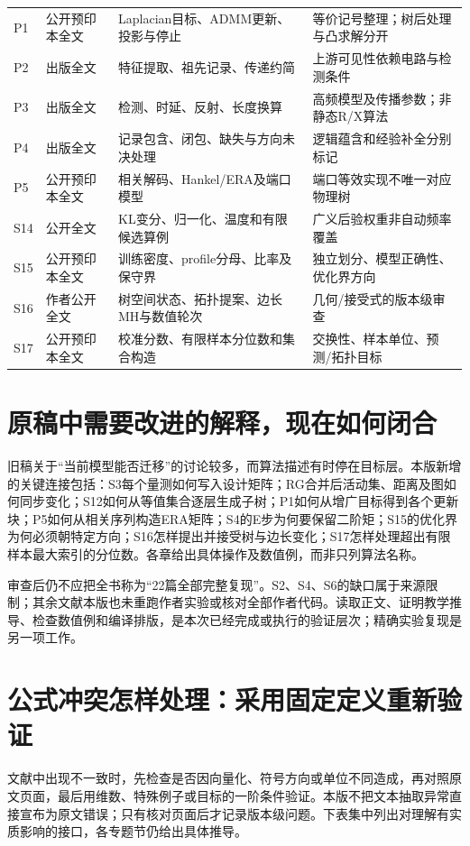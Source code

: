 \begin{longtable}{p{}p{}p{}p{}}
P1 & 公开预印本全文 & Laplacian目标、ADMM更新、投影与停止 & 等价记号整理；树后处理与凸求解分开\\
P2 & 出版全文 & 特征提取、祖先记录、传递约简 & 上游可见性依赖电路与检测条件\\
P3 & 出版全文 & 检测、时延、反射、长度换算 & 高频模型及传播参数；非静态R/X算法\\
P4 & 出版全文 & 记录包含、闭包、缺失与方向未决处理 & 逻辑蕴含和经验补全分别标记\\
P5 & 公开预印本全文 & 相关解码、Hankel/ERA及端口模型 & 端口等效实现不唯一对应物理树\\
S14 & 公开全文 & KL变分、归一化、温度和有限候选算例 & 广义后验权重非自动频率覆盖\\
S15 & 公开预印本全文 & 训练密度、profile分母、比率及保守界 & 独立划分、模型正确性、优化界方向\\
S16 & 作者公开全文 & 树空间状态、拓扑提案、边长MH与数值轮次 & 几何/接受式的版本级审查\\
S17 & 公开预印本全文 & 校准分数、有限样本分位数和集合构造 & 交换性、样本单位、预测/拓扑目标\\
\bottomrule
\end{longtable}

\section{原稿中需要改进的解释，现在如何闭合}
旧稿关于“当前模型能否迁移”的讨论较多，而算法描述有时停在目标层。本版新增的关键连接包括：S3每个量测如何写入设计矩阵；RG合并后活动集、距离及图如何同步变化；S12如何从等值集合逐层生成子树；P1如何从增广目标得到各个更新块；P5如何从相关序列构造ERA矩阵；S4的E步为何要保留二阶矩；S15的优化界为何必须朝特定方向；S16怎样提出并接受树与边长变化；S17怎样处理超出有限样本最大索引的分位数。各章给出具体操作及数值例，而非只列算法名称。

审查后仍不应把全书称为“22篇全部完整复现”。S2、S4、S6的缺口属于来源限制；其余文献本版也未重跑作者实验或核对全部作者代码。读取正文、证明教学推导、检查数值例和编译排版，是本次已经完成或执行的验证层次；精确实验复现是另一项工作。

\section{公式冲突怎样处理：采用固定定义重新验证}
文献中出现不一致时，先检查是否因向量化、符号方向或单位不同造成，再对照原文页面，最后用维数、特殊例子或目标的一阶条件验证。本版不把文本抽取异常直接宣布为原文错误；只有核对页面后才记录版本级问题。下表集中列出对理解有实质影响的接口，各专题节仍给出具体推导。

